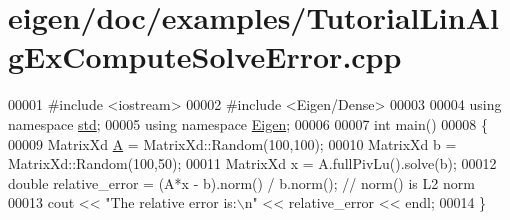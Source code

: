 \hypertarget{eigen_2doc_2examples_2_tutorial_lin_alg_ex_compute_solve_error_8cpp_source}{}\section{eigen/doc/examples/\+Tutorial\+Lin\+Alg\+Ex\+Compute\+Solve\+Error.cpp}
\label{eigen_2doc_2examples_2_tutorial_lin_alg_ex_compute_solve_error_8cpp_source}

\begin{DoxyCode}
00001 \textcolor{preprocessor}{#include <iostream>}
00002 \textcolor{preprocessor}{#include <Eigen/Dense>}
00003 
00004 \textcolor{keyword}{using namespace }\hyperlink{namespacestd}{std};
00005 \textcolor{keyword}{using namespace }\hyperlink{namespace_eigen}{Eigen};
00006 
00007 \textcolor{keywordtype}{int} main()
00008 \{
00009    MatrixXd \hyperlink{group___core___module_class_eigen_1_1_matrix}{A} = MatrixXd::Random(100,100);
00010    MatrixXd b = MatrixXd::Random(100,50);
00011    MatrixXd x = A.fullPivLu().solve(b);
00012    \textcolor{keywordtype}{double} relative\_error = (A*x - b).norm() / b.norm(); \textcolor{comment}{// norm() is L2 norm}
00013    cout << \textcolor{stringliteral}{"The relative error is:\(\backslash\)n"} << relative\_error << endl;
00014 \}
\end{DoxyCode}
